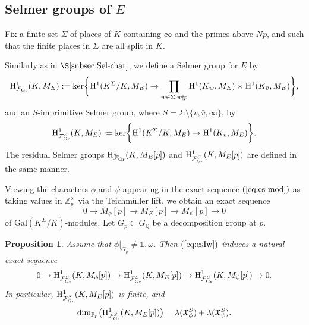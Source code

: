\documentclass[10pt]{amsart}
\numberwithin{equation}{section}
\newtheorem{prop}[theorem]{Proposition}
\theoremstyle{definition}
\theoremstyle{remark}
\newcommand{\Z}{\mathbb{Z}}
\newcommand{\Fcal}{\mathcal{F}}
\newcommand{\Q}{\mathbb{Q}}
\newcommand{\rH}{\mathrm{H}}
\begin{document}
\subsection{Selmer groups of \texorpdfstring{$E$}{E}}
\label{subsec:Sel-E}

Fix a finite set $\Sigma$ of places of $K$ containing $\infty$ and the primes above $Np$, and such that the finite places in $\Sigma$ are all split in $K$. 

Similarly as in $\S\ref{subsec:Sel-char}$, we define a Selmer group for $E$ by  
\[
\rH^1_{\Fcal_{\rm Gr}}(K,M_E):=\ker\biggr\{\rH^1(K^\Sigma/K,M_E)\rightarrow\prod_{w \in \Sigma, w \nmid p}\rH^1(K_w,M_E)\times\rH^1(K_{\bar{v}},M_E)\biggr\},
\]
and an 
{$S$-imprimitive Selmer group}, where $S=\Sigma\setminus\{v,\bar{v},\infty\}$, by 
\[
\rH^1_{\Fcal_{\rm Gr}^S}(K,M_E):=\ker\biggr\{\rH^1(K^\Sigma/K,M_E)\rightarrow\rH^1(K_{\bar{v}},M_E)\biggr\}.
\]
The residual Selmer groups $\rH^1_{\Fcal_{\rm Gr}}(K,M_E[p])$ and $\rH^1_{\Fcal_{\rm Gr}^S}(K,M_E[p])$ are defined in the same manner.

Viewing the characters $\phi$ and $\psi$ appearing in the exact sequence $(\ref{eq:es-mod})$ as taking values in $\Z_p^\times$ via the Teichm\"uller lift, we obtain an exact sequence 
\begin{equation}\label{eq:esIw}
0 \rightarrow M_\phi[p] \rightarrow M_E[p] \rightarrow M_\psi[p] \rightarrow 0
\end{equation}
of $\mathrm{Gal}(K^{\Sigma}/K)$-modules. Let $G_p\subset G_\Q$ be a decomposition group at $p$.

\begin{prop}\label{cormodp} 
Assume that $\phi\vert_{G_{p}}\neq\mathds{1},\omega$. Then 
$(\ref{eq:esIw})$ induces a natural exact sequence 
\[
0 \rightarrow \rH^1_{\Fcal_{\rm Gr}^S}(K,M_\phi[p]) \rightarrow \rH^1_{\Fcal_{\rm Gr}^S}(K,M_E[p]) \rightarrow 
\rH^1_{\Fcal_{\rm Gr}^S}(K,M_\psi[p]) \rightarrow 0.
\]
In particular, $\rH^1_{\Fcal_{\rm Gr}^S}(K,M_E[p])$ is finite, and 
\[
\mathrm{dim}_{\mathbb{F}_p}\bigl(\rH^1_{\Fcal_{\rm Gr}^S}(K,M_E[p])\bigr)=\lambda(\mathfrak{X}_\phi^S)+\lambda(\mathfrak{X}_{\psi}^S).
\]
\end{prop}
\end{document}
